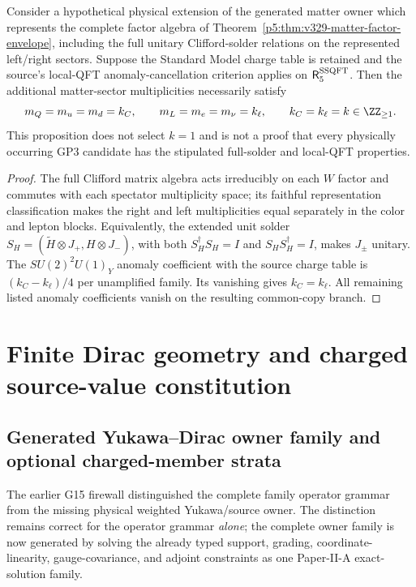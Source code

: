 \documentclass[12pt,a4paper]{article}
\begin{document}
\begin{proposition}
\label{p5:prop:v329-solder-anomaly-commoncopy}
Consider a hypothetical physical extension of the generated matter
owner which represents the complete factor algebra of
Theorem~\ref{p5:thm:v329-matter-factor-envelope}, including
the full unitary Clifford-solder relations on the represented
left/right sectors. Suppose the Standard Model charge table is
retained and the source's local-QFT anomaly-cancellation criterion
applies on $\mathsf R_5^{\rm SSQFT}$.
Then the additional matter-sector multiplicities necessarily satisfy
\[
 m_Q=m_u=m_d=k_C,\qquad
 m_L=m_e=m_\nu=k_\ell,\qquad
 k_C=k_\ell=k\in\ZZ_{\ge1}.
\]
This proposition does not select $k=1$ and is not a proof that every
physically occurring GP3 candidate has the stipulated full-solder
and local-QFT properties.
\end{proposition}
\begin{proof}
The full Clifford matrix algebra acts irreducibly on each $W$ factor
and commutes with each spectator multiplicity space; its faithful
representation classification makes the right and left multiplicities
equal separately in the color and lepton blocks. Equivalently, the
extended unit solder $S_H=(\widetilde H\otimes J_+,H\otimes J_-)$,
with both $S_H^\dagger S_H=I$ and $S_HS_H^\dagger=I$, makes
$J_\pm$ unitary. The $SU(2)^2U(1)_Y$ anomaly coefficient with the
source charge table is $(k_C-k_\ell)/4$ per unamplified family.
Its vanishing gives $k_C=k_\ell$. All remaining listed anomaly
coefficients vanish on the resulting common-copy branch.
\end{proof}



\section{Finite Dirac geometry and charged source-value constitution}
\label{p5a:sec:organized-source}
\subsection{Generated Yukawa--Dirac owner family and optional charged-member strata}
\label{p5:sec:v186-yukawa-dirac-owner-family}

The earlier G15 firewall distinguished the complete family operator grammar
from the missing physical weighted Yukawa/source owner.  The distinction
remains correct for the operator grammar \emph{alone}; the complete owner
family is now generated by solving the already typed support, grading,
coordinate-linearity, gauge-covariance, and adjoint constraints as one
Paper-II-A exact-solution family.
\end{document}
